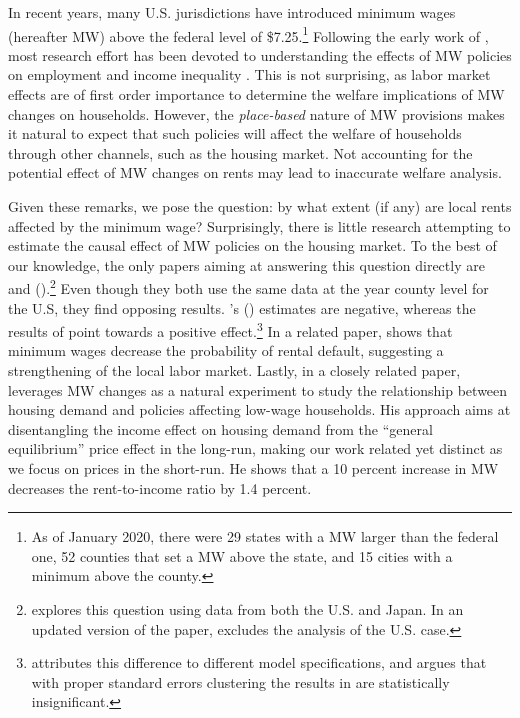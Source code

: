 
In recent years, many U.S. jurisdictions have introduced minimum wages (hereafter MW) 
above the federal level of \$7.25.\footnote{As of January 2020, there were 29 states with 
	a MW larger than the federal one, 52 counties that set a MW above the state, and 15 
	cities with a minimum above the county.}
Following the early work of \textcite{CardKrueger2000}, most research effort has been 
devoted to understanding the effects of MW policies on 
employment \parencite[e.g.,][]{Neumark2006, DubeEtAl2010, MeerWest2016, CegnizEtAl2019} 
and income inequality \parencite{Lee1999, AutorEtAl2016}.
This is not surprising, as labor market effects are of first order importance to 
determine the welfare implications of MW changes on households. However, the 
\textit{place-based} nature of MW provisions makes it natural to expect that such 
policies will affect the welfare of households through other channels, such as the 
housing market.
Not accounting for the potential effect of MW changes on rents may lead to inaccurate 
welfare analysis.

Given these remarks, we pose the question: by what extent (if any) are local rents 
affected by the minimum wage? 
Surprisingly, there is little research attempting to estimate the causal effect of MW 
policies on the housing market. 
To the best of our knowledge, the only papers aiming at answering this question directly 
are \textcite{Tidemann2018} and \citeauthor{Yamagishi2019} (\citeyear{Yamagishi2019, 
Yamagishi2020}).\footnote{\textcite{Yamagishi2019} explores this question using data from 
	both the U.S. and Japan. In an updated version of the paper, \textcite{Yamagishi2020} 
	excludes the analysis of the U.S. case.}
Even though they both use the same data at the year county level for the U.S, they find 
opposing results. \citeauthor{Tidemann2018}'s (\citeyear{Tidemann2018}) estimates are 
negative, whereas the results of \textcite{Yamagishi2019} point towards a positive 
effect.\footnote{\textcite{Yamagishi2019} attributes this difference to different model 
	specifications, and argues that with proper standard errors clustering the results in 
	\textcite{Tidemann2018} are statistically insignificant.} 
In a related paper, \textcite{AgarwalEtAl2019} shows that minimum wages decrease the 
probability of rental default, suggesting a strengthening of the local labor market. 
Lastly, in a closely related paper, \textcite{Hughes2020} leverages MW changes as a 
natural experiment to study the relationship between housing demand and policies 
affecting low-wage households. 
His approach aims at disentangling the income effect on housing demand from the 
``general equilibrium'' price effect in the long-run, making our work related yet 
distinct as we focus on prices in the short-run. He shows that a 10 percent increase in 
MW decreases the rent-to-income ratio by 1.4 percent.

